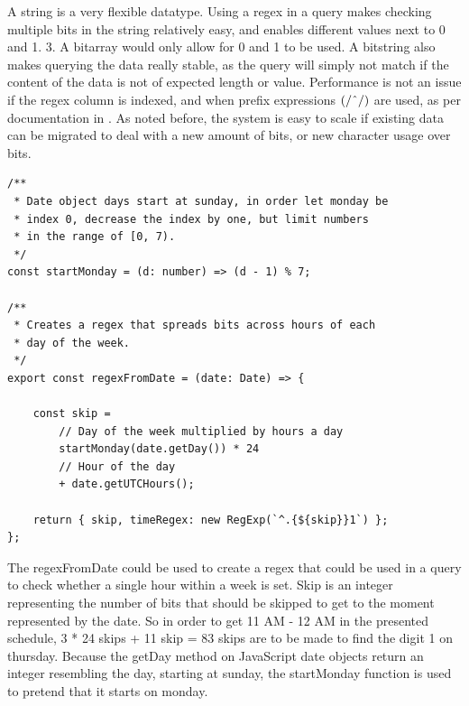 A string is a very flexible datatype. Using a regex in a query makes checking multiple bits in the string relatively easy, and enables different values next to 0 and 1. 3. A bitarray would only allow for 0 and 1 to be used. A bitstring also makes querying the data really stable, as the query will simply not match if the content of the data is not of expected length or value. Performance is not an issue if the regex column is indexed, and when prefix expressions $(/\string^/)$ are used, as per documentation in \cite{MongoDB-Regex}. As noted before, the system is easy to scale if existing data can be migrated to deal with a new amount of bits, or new character usage over bits.

\begin{lstlisting}[caption={Opening timeframe.}, label={lst:open-timeframe}]
/**
 * Date object days start at sunday, in order let monday be
 * index 0, decrease the index by one, but limit numbers
 * in the range of [0, 7).
 */
const startMonday = (d: number) => (d - 1) % 7;

/**
 * Creates a regex that spreads bits across hours of each
 * day of the week.
 */
export const regexFromDate = (date: Date) => {

	const skip =
		// Day of the week multiplied by hours a day
		startMonday(date.getDay()) * 24
		// Hour of the day
		+ date.getUTCHours();

	return { skip, timeRegex: new RegExp(`^.{${skip}}1`) };
};
\end{lstlisting}

The regexFromDate could be used to create a regex that could be used in a query to check whether a single hour within a week is set. Skip is an integer representing the number of bits that should be skipped to get to the moment represented by the date. So in order to get 11 AM - 12 AM in the presented schedule, 3 * 24 skips + 11 skip = 83 skips are to be made to find the digit 1 on thursday. Because the getDay method on JavaScript date objects return an integer resembling the day, starting at sunday, the startMonday function is used to pretend that it starts on monday.


